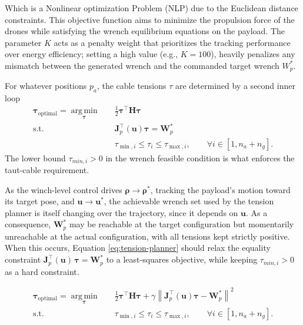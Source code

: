 Which is a Nonlinear optimization Problem (NLP) due to the Euclidean distance constraints. %
This objective function aims to minimize the propulsion force of the drones while satisfying the wrench equilibrium equations on the payload. The parameter $K$ acts as a penalty weight that prioritizes the tracking performance over energy efficiency; setting a high value (e.g., $K=100$), heavily penalizes any mismatch between the generated wrench and the commanded target wrench $W_p^*$.

For whatever positions $p_a$, the cable tensions $\tau$ are determined by a second inner loop
\begin{equation}
\begin{aligned}
\boldsymbol{\tau}_{\mathrm{optimal}} = \underset{\boldsymbol{\tau}}{\operatorname{arg\,min}} \quad& \frac{1}{2} \boldsymbol{\tau}^{\top} \mathbf{H} \boldsymbol{\tau} \\
\text{s.t.}\quad & \mathbf{J}_p^\top(\mathbf{u}) \boldsymbol{\tau} = \mathbf{W}_p^* \\ & \tau_{\min,i} \leq \tau_i \leq \tau_{\max,i}, \qquad \forall i\in[1,n_a+n_g].
\end{aligned}
\label{eq:tension-planner}
\end{equation}
The lower bound $\tau_{min, i}>0$ in the wrench feasible condition is what enforces the taut-cable requirement.

As the winch-level control drives $\boldsymbol{\rho} \to \boldsymbol{\rho}^*$, tracking the payload's motion toward its target pose, and $\mathbf{u} \to \mathbf{u}^*$, the achievable wrench set used by the tension planner is itself changing over the trajectory, since it depends on $\mathbf{u}$. As a consequence, $\mathbf{W}_p^*$ may be reachable at the target configuration but momentarily unreachable at the actual configuration, with all tensions kept strictly positive. When this occurs, Equation \eqref{eq:tension-planner} should relax the equality constraint $\mathbf{J}_p^\top(\mathbf{u})\,\mathbf{\tau} = \mathbf{W}_p^*$ to a least-squares objective, while keeping $\tau_{min,i} > 0$ as a hard constraint. 

\begin{equation}
\begin{aligned}
\boldsymbol{\tau}_{\mathrm{optimal}} = \underset{\boldsymbol{\tau}}{\operatorname{arg\,min}} \quad& \frac{1}{2} \boldsymbol{\tau}^{\top} \mathbf{H} \boldsymbol{\tau} + \gamma \left\|     \mathbf{J}_p^\top(\mathbf{u})     \boldsymbol{\tau}     -     \mathbf{W}_p^* \right\|^2 \\ 
\text{s.t.}\quad & \tau_{\min,i} \leq \tau_i \leq \tau_{\max,i}, \qquad \forall i\in[1,n_a+n_g].
\end{aligned}
\label{eq:tension-planner-relax}
\end{equation}



